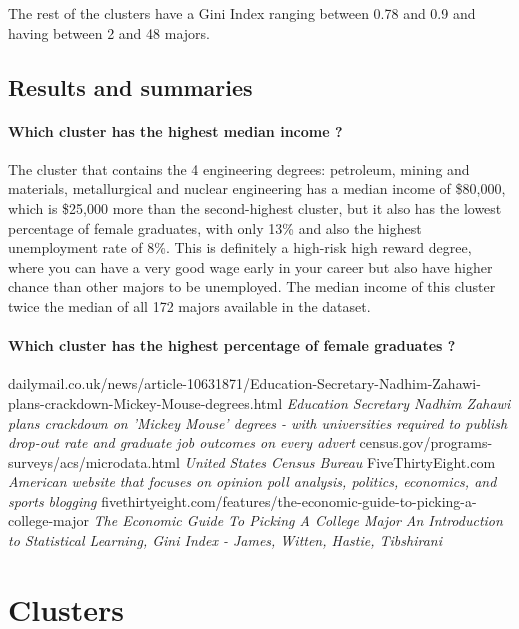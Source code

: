 \documentclass[11pt]{article}
\begin{document}
The rest of the clusters have a Gini Index ranging between 0.78 and 0.9 and having between 2 and 48 majors.

\subsection*{Results and summaries}

\paragraph*{Which cluster has the highest median income ?}
The cluster that contains the 4 engineering degrees: petroleum, mining and materials, metallurgical and nuclear engineering has a median income of \$80,000, which is \$25,000 more than the second-highest cluster, but it also has the lowest percentage of female graduates, with only 13\% and also the highest unemployment rate of 8\%. This is definitely a high-risk high reward degree, where you can have a very good wage early in your career but also have higher chance than other majors to be unemployed. The median income of this cluster twice the median of all 172 majors available in the dataset.

\paragraph*{Which cluster has the highest percentage of female graduates ?}



\begin{thebibliography}{9}
        dailymail.co.uk/news/article-10631871/Education-Secretary-Nadhim-Zahawi-plans-crackdown-Mickey-Mouse-degrees.html \emph{Education Secretary Nadhim Zahawi plans crackdown on 'Mickey Mouse' degrees - with universities required to publish drop-out rate and graduate job outcomes on every advert}
        census.gov/programs-surveys/acs/microdata.html \emph{United States Census Bureau}
        FiveThirtyEight.com \emph{American website that focuses on opinion poll analysis, politics, economics, and sports blogging}
        fivethirtyeight.com/features/the-economic-guide-to-picking-a-college-major \emph{The Economic Guide To Picking A College Major}
        \emph{An Introduction to Statistical Learning, Gini Index - James, Witten, Hastie, Tibshirani}
\end{thebibliography}

\appendix
\section {Clusters}
\end{document}
